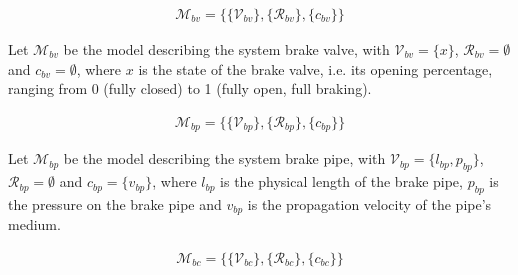 \begin{align*}
{\mathcal {M}}_{bv} = \{ \{{\mathcal {V}}_{bv}\}, \{{\mathcal{R}}_{bv}\}, \{c_{bv}\} \}
\end{align*}

\noindent
Let ${\mathcal {M}}_{bv}$ be the model describing the system brake valve, with ${\mathcal {V}}_{bv} = \{x\}$, ${\mathcal {R}}_{bv} = \emptyset$ and $c_{bv} = \emptyset$, where $x$ is the state of the brake valve, i.e. its opening percentage, ranging from 0 (fully closed) to 1 (fully open, full braking).

\begin{align*}
{\mathcal {M}}_{bp} = \{ \{{\mathcal {V}}_{bp}\}, \{{\mathcal{R}}_{bp}\}, \{c_{bp}\} \}
\end{align*}

\noindent
Let ${\mathcal {M}}_{bp}$ be the model describing the system brake pipe, with ${\mathcal {V}}_{bp} = \{ l_{bp}, p_{bp} \}$, ${\mathcal {R}}_{bp} = \emptyset$ and $c_{bp} = \{ v_{bp} \}$, where $l_{bp}$ is the physical length of the brake pipe, $p_{bp}$ is the pressure on the brake pipe and $v_{bp}$ is the propagation velocity of the pipe's medium. 

\begin{align*}
{\mathcal {M}}_{bc} = \{ \{{\mathcal {V}}_{bc}\}, \{{\mathcal{R}}_{bc}\}, \{c_{bc}\} \}
\end{align*}

